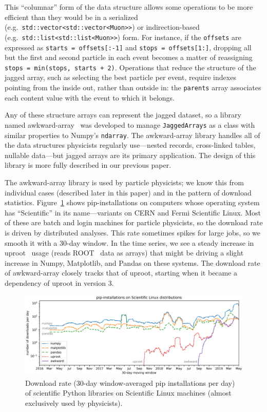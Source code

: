\documentclass[a4paper]{jpconf}
\begin{document}
This ``columnar'' form of the data structure allows some operations to be more efficient than they would be in a serialized (e.g.\ {\tt std::vector<std::vector<Muon>>}) or indirection-based (e.g.\ {\tt std::list<std::list<Muon>>}) form. For instance, if the {\tt offsets} are expressed as {\tt starts = offsets[:-1]} and {\tt stops = offsets[1:]}, dropping all but the first and second particle in each event becomes a matter of reassigning {\tt stops = min(stops, starts + 2)}. Operations that reduce the structure of the jagged array, such as selecting the best particle per event, require indexes pointing from the inside out, rather than outside in: the {\tt parents} array associates each content value with the event to which it belongs.

Any of these structure arrays can represent the jagged dataset, so a library named awkward-array~\cite{awkward} was developed to manage {\tt JaggedArrays} as a class with similar properties to Numpy's {\tt ndarray}. The awkward-array library handles all of the data structures physicists regularly use---nested records, cross-linked tables, nullable data---but jagged arrays are its primary application. The design of this library is more fully described in our previous paper\cite{2019EPJWC}.

The awkward-array library is used by particle physicists; we know this from individual cases (described later in this paper) and in the pattern of download statistics. Figure~\ref{fig:uproot} shows pip-installations on computers whose operating system has ``Scientific'' in its name---variants on CERN and Fermi Scientific Linux. Most of these are batch and login machines for particle physicists, so the download rate is driven by distributed analyses. This rate sometimes spikes for large jobs, so we smooth it with a 30-day window. In the time series, we see a steady increase in uproot~\cite{uproot} usage (reads ROOT~\cite{root} data as arrays) that might be driving a slight increase in Numpy, Matplotlib, and Pandas on these systems. The download rate of awkward-array closely tracks that of uproot, starting when it became a dependency of uproot in version 3.

\begin{figure}
\begin{center}
\includegraphics[width=0.9\linewidth]{pip-scientificlinux-uproot-gray.pdf}
\end{center}

\vspace{-0.25 cm}
\caption{Download rate (30-day window-averaged pip installations per day) of scientific Python libraries on Scientific Linux machines (almost exclusively used by physicists). \label{fig:uproot}}
\end{figure}
\end{document}
